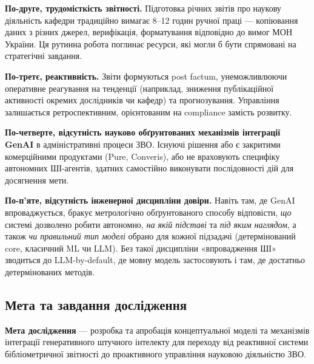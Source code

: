 \textbf{По-друге, трудомісткість звітності.} Підготовка річних звітів про наукову діяльність кафедри традиційно вимагає 8--12 годин ручної праці --- копіювання даних з різних джерел, верифікація, форматування відповідно до вимог МОН України. Ця рутинна робота поглинає ресурси, які могли б бути спрямовані на стратегічні завдання.

\textbf{По-третє, реактивність.} Звіти формуються post factum, унеможливлюючи оперативне реагування на тенденції (наприклад, зниження публікаційної активності окремих дослідників чи кафедр) та прогнозування. Управління залишається ретроспективним, орієнтованим на compliance замість розвитку.

\textbf{По-четверте, відсутність науково обґрунтованих механізмів інтеграції GenAI} в адміністративні процеси ЗВО. Існуючі рішення або є закритими комерційними продуктами (Pure, Converis), або не враховують специфіку автономних ШІ-агентів, здатних самостійно виконувати послідовності дій для досягнення мети.

\iftrace
\textbf{По-п'яте, відсутність інженерної дисципліни довіри.} Навіть там, де GenAI впроваджується, бракує метрологічно обґрунтованого способу відповісти, \emph{що} системі дозволено робити автономно, \emph{на якій підставі} та \emph{під яким наглядом}, а також \emph{чи правильний тип моделі} обрано для кожної підзадачі (детермінований core, класичний ML чи LLM). Без такої дисципліни «впровадження ШІ» зводиться до LLM-by-default, де мовну модель застосовують і там, де достатньо детермінованих методів.
\fi

\subsection*{Мета та завдання дослідження}

\textbf{Мета дослідження} --- розробка та апробація концептуальної моделі та механізмів інтеграції генеративного штучного інтелекту для переходу від реактивної системи бібліометричної звітності до проактивного управління науковою діяльністю ЗВО.

